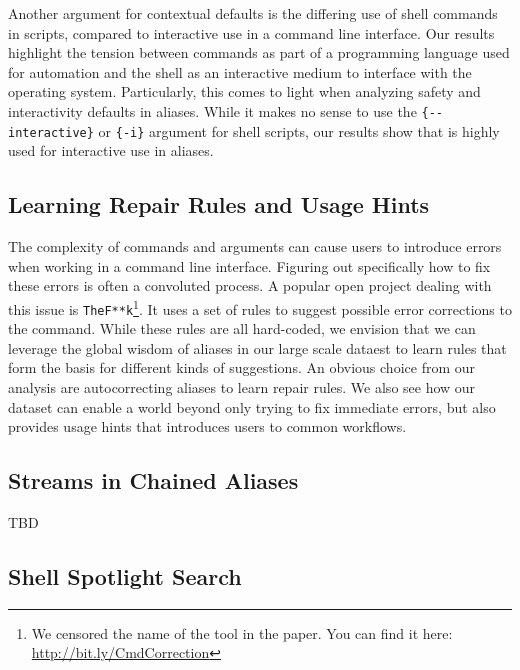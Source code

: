Another argument for contextual defaults is the differing use of shell commands in scripts, compared to interactive use in a command line interface.
Our results highlight the tension between commands as part of a programming language used for automation and the shell as an interactive medium to interface with the operating system.
Particularly, this comes to light when analyzing safety and interactivity defaults in aliases.
While it makes no sense to use the \verb|{--interactive}| or \verb|{-i}| argument for shell scripts, our results show that is highly used for interactive use in aliases.

\subsection{Learning Repair Rules and Usage Hints}

The complexity of commands and arguments can cause users to introduce errors when working in a command line interface.
Figuring out specifically how to fix these errors is often a convoluted process.
A popular open project dealing with this issue is \texttt{TheF**k}\footnote{We censored the name of the tool in the paper. You can find it here: \url{http://bit.ly/CmdCorrection}}.
It uses a set of rules to suggest possible error corrections to the command.
While these rules are all hard-coded, we envision that we can leverage the global wisdom of aliases in our large scale dataest to learn rules that form the basis for different kinds of suggestions.
An obvious choice from our analysis are autocorrecting aliases to learn repair rules.
We also see how our dataset can enable a world beyond only trying to fix immediate errors, but also provides usage hints that introduces users to common workflows.

\subsection{Streams in Chained Aliases}

TBD



\subsection{Shell Spotlight Search}


